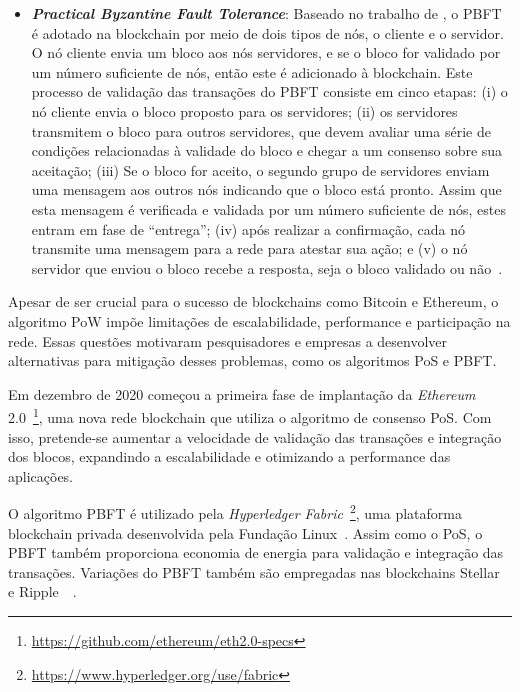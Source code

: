 \begin{itemize}
    \item \textbf{\textit{Practical Byzantine Fault Tolerance}}: Baseado no trabalho de , o PBFT é adotado na blockchain por meio de dois tipos de nós, o cliente e o servidor. O nó cliente envia um bloco aos nós servidores, e se o bloco for validado por um número suficiente de nós, então este é adicionado à blockchain. Este processo de validação das transações do PBFT consiste em cinco etapas: (i) o nó cliente envia o bloco proposto para os servidores; (ii) os servidores transmitem o bloco para outros servidores, que devem avaliar uma série de condições relacionadas à validade do bloco e chegar a um consenso sobre sua aceitação; (iii) Se o bloco for aceito, o segundo grupo de servidores enviam uma mensagem aos outros nós indicando que o bloco está pronto. Assim que esta mensagem é verificada e validada por um número suficiente de nós, estes entram em fase de ``entrega''; (iv) após realizar a confirmação, cada nó transmite uma mensagem para a rede para atestar sua ação; e (v) o nó servidor que enviou o bloco recebe a resposta, seja o bloco validado ou não~\cite{consenso-Bouraga2021,consenso-xiao-2020,overview-ahmed-2019,consenso-zhang2020analysis}. 
\end{itemize} 

Apesar de ser crucial para o sucesso de blockchains como Bitcoin e Ethereum, o algoritmo PoW impõe limitações de escalabilidade, performance e participação na rede. Essas questões motivaram pesquisadores e empresas a desenvolver alternativas para mitigação desses problemas, como os algoritmos PoS e PBFT. 

Em dezembro de 2020 começou a primeira fase de implantação da \textit{Ethereum} 2.0~\footnote{\url{https://github.com/ethereum/eth2.0-specs}}, uma nova rede blockchain que utiliza o algoritmo de consenso PoS. Com isso, pretende-se aumentar a velocidade de validação das transações e integração dos blocos, expandindo a escalabilidade e otimizando a performance das aplicações.

O algoritmo PBFT é utilizado pela \textit{Hyperledger Fabric}~\footnote{\url{https://www.hyperledger.org/use/fabric}}, uma plataforma blockchain privada desenvolvida pela Fundação Linux~\cite{overview-hyperledger2018androulaki}. Assim como o PoS, o PBFT também proporciona economia de energia para validação e integração das transações. Variações do PBFT também são empregadas nas blockchains Stellar~\cite{overview-stellar2015mazieres} e Ripple~\cite{overview-schwartz2014ripple}~\cite{overview-ahmed-2019, consenso-xiao-2020, consenso-zhang2020analysis}.
 
